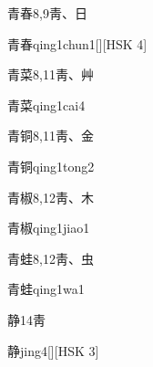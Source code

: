 \begin{entry}{青春}{8,9}{⾭、⽇}
  \begin{phonetics}{青春}{qing1chun1}[][HSK 4]
  \end{phonetics}
\end{entry}

\begin{entry}{青菜}{8,11}{⾭、⾋}
  \begin{phonetics}{青菜}{qing1cai4}
  \end{phonetics}
\end{entry}

\begin{entry}{青铜}{8,11}{⾭、⾦}
  \begin{phonetics}{青铜}{qing1tong2}
  \end{phonetics}
\end{entry}

\begin{entry}{青椒}{8,12}{⾭、⽊}
  \begin{phonetics}{青椒}{qing1jiao1}
  \end{phonetics}
\end{entry}

\begin{entry}{青蛙}{8,12}{⾭、⾍}
  \begin{phonetics}{青蛙}{qing1wa1}
  \end{phonetics}
\end{entry}

\begin{entry}{静}{14}{⾭}
  \begin{phonetics}{静}{jing4}[][HSK 3]
  \end{phonetics}
\end{entry}


